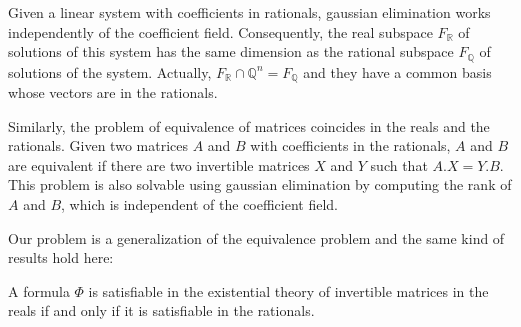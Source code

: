 Given a linear system with coefficients in rationals, gaussian elimination works independently of the coefficient field. Consequently, the real subspace $F_{\mathbb{R}}$ of solutions of this system has the same dimension as the rational subspace $F_{\mathbb{Q}}$ of solutions of the system. Actually, $F_{\mathbb{R}}\cap \mathbb{Q}^n = F_{\mathbb{Q}}$ and they have a common basis whose vectors are in the rationals.

Similarly, the problem of equivalence of matrices coincides in the reals and the rationals. Given two matrices $A$ and $B$ with coefficients in the rationals, $A$ and $B$ are equivalent if there are two invertible matrices $X$ and $Y$ such that $A.X = Y.B$. This problem is also solvable using gaussian elimination by computing the rank of $A$ and $B$, which is independent of the coefficient field.

Our problem is a generalization of the equivalence problem and the same kind of results hold here:

\begin{prop}
A formula $\Phi$ is satisfiable in the existential theory of invertible matrices in the reals if and only if it is satisfiable in the rationals.
\end{prop}

